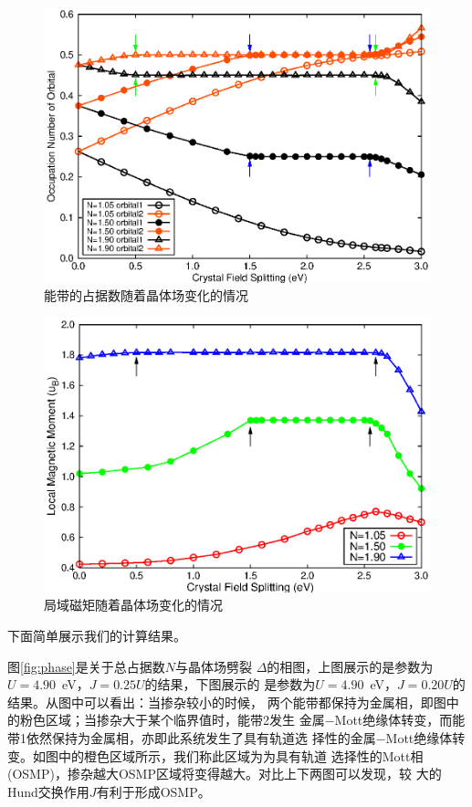 \begin{figure}
\centering
\includegraphics{figure/occu.eps}
\caption{能带的占据数随着晶体场变化的情况} 
\label{fig:occu}
\end{figure}

\begin{figure}
\centering
\includegraphics{figure/sz.eps}
\caption{局域磁矩随着晶体场变化的情况} 
\label{fig:magnetic}
\end{figure}

下面简单展示我们的计算结果。

图\ref{fig:phase}是关于总占据数$N$与晶体场劈裂
$\Delta$的相图，上图展示的是参数为$U=4.90$\ eV，$J=0.25U$的结果，下图展示的
是参数为$U=4.90$\ eV，$J=0.20U$的结果。从图中可以看出：当掺杂较小的时候，
两个能带都保持为金属相，即图中的粉色区域；当掺杂大于某个临界值时，能带2发生
金属$-$Mott绝缘体转变，而能带1依然保持为金属相，亦即此系统发生了具有轨道选
择性的金属$-$Mott绝缘体转变。如图中的橙色区域所示，我们称此区域为为具有轨道
选择性的Mott相(OSMP)，掺杂越大OSMP区域将变得越大。对比上下两图可以发现，较
大的Hund交换作用$J$有利于形成OSMP。

